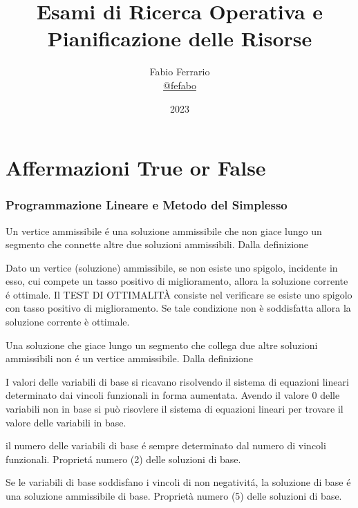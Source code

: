 \documentclass[12pt, a4paper, openany]{book}
\begin{document}
\title{Esami di Ricerca Operativa e Pianificazione delle Risorse}
\author{
	Fabio Ferrario\\
	\small{\href{https://t.me/fefabo}{@fefabo}}
}

\date{2023}
\maketitle


\tableofcontents

\chapter{Affermazioni True or False}

\subsection{Programmazione Lineare e Metodo del Simplesso}

\affermazionetrue
{Un vertice ammissibile é una soluzione ammissibile che non giace lungo un segmento che connette altre due soluzioni ammissibili.}
{Dalla definizione}

\affermazionetrue
{Dato un vertice (soluzione) ammissibile, se non esiste uno spigolo, incidente in esso, cui compete un tasso positivo di miglioramento, allora la soluzione corrente é ottimale.}
{Il TEST DI OTTIMALITÀ consiste nel verificare se
esiste uno spigolo con tasso positivo di
miglioramento. Se tale condizione non è
soddisfatta allora la soluzione corrente è
ottimale.}

\affermazionetrue
{Una soluzione che giace lungo un segmento che collega due altre soluzioni ammissibili non é un vertice ammissibile.}
{Dalla definizione}

\affermazionetrue
{I valori delle variabili di base si ricavano risolvendo il sistema di equazioni lineari determinato dai vincoli funzionali in forma aumentata.}
{Avendo il valore 0 delle variabili non in base si può risovlere il sistema di equazioni lineari per trovare il valore delle variabili in base.}


\affermazionetrue
{il numero delle variabili di base é sempre determinato dal numero di vincoli funzionali.}
{Proprietá numero (2) delle soluzioni di base.}

\affermazionetrue
{Se le variabili di base soddisfano i vincoli di non negativitá, la soluzione di base é una soluzione ammissibile di base.}
{Proprietà numero (5) delle soluzioni di base.}
\end{document}
